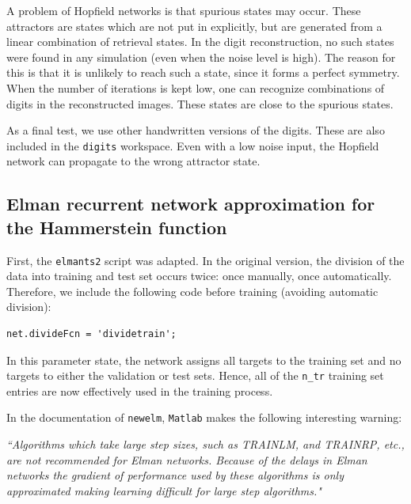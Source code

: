 \documentclass[pdftex,11pt,a4paper]{article}
\begin{document}
A problem of Hopfield networks is that spurious states may occur. These attractors are states which are not put in explicitly, but are generated from a linear combination of retrieval states. In the digit reconstruction, no such states were found in any simulation (even when the noise level is high). The reason for this is that it is unlikely to reach such a state, since it forms a perfect symmetry. When the number of iterations is kept low, one can recognize combinations of digits in the reconstructed images. These states are close to the spurious states. 

As a final test, we use other handwritten versions of the digits. These are also included in the \texttt{digits} workspace. Even with a low noise input, the Hopfield network can propagate to the wrong attractor state.

\subsection{Elman recurrent network approximation for the Hammerstein function}
First, the \texttt{elmants2} script was adapted. In the original version, the division of the data into training and test set occurs twice: once manually, once automatically. Therefore, we include the following code before training (avoiding automatic division):
\lstset{language=Matlab}          %
\begin{lstlisting}
net.divideFcn = 'dividetrain';
\end{lstlisting}
In this parameter state, the network assigns all targets to the training set and no targets to either the validation or test sets. Hence, all of the \texttt{n\_tr} training set entries are now effectively used in the training process.

In the documentation of \texttt{newelm}, \texttt{Matlab} makes the following interesting warning:

\textit{``Algorithms which take large step sizes, such as TRAINLM,
     and TRAINRP, etc., are not recommended for Elman networks.  Because
     of the delays in Elman networks the gradient of performance used
     by these algorithms is only approximated making learning difficult
     for large step algorithms."}
\end{document}
